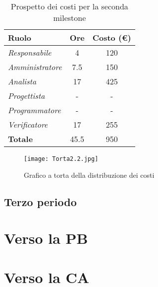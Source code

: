 \begin{table}[!ht]
    \centering
    \begin{tabular}{|l|c|c|}
    \hline
    \textbf{Ruolo} & \multicolumn{1}{l|}{\textbf{Ore}} & \multicolumn{1}{l|}{\textbf{Costo (€)}} \\ \hline
    \textit{Responsabile} & 4 & 120 \\ \hline
    \textit{Amministratore} & 7.5 & 150 \\ \hline
    \textit{Analista} & 17 & 425 \\ \hline
    \textit{Progettista} & - & - \\ \hline
    \textit{Programmatore} & - & - \\ \hline
    \textit{Verificatore} & 17 & 255 \\ \hline
    \textbf{Totale} & 45.5 & 950 \\ \hline
    \end{tabular}
    \caption{Prospetto dei costi per la seconda milestone}
\end{table}

\begin{figure}[!ht]
    \texttt{[image: Torta2.2.jpg]}
    \caption{Grafico a torta della distribuzione dei costi} 
\end{figure}

\newpage
\subsection{Terzo periodo}

\section{Verso la PB}

\section{Verso la CA}